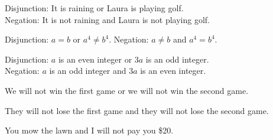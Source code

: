 \begin{list}{}
\item \begin{list}{\bf{(b)}}
\item Disjunction:  It is raining or Laura is playing golf.  \\Negation:  It is not raining and Laura is not playing golf.
\end{list}
\end{list}

\begin{list}{}
\item \begin{list}{\bf{(c)}}
\item Disjunction:  $a = b$ or $a^4 \ne b^4$.  Negation:  $a \ne b$ and $a^4 = b^4$.
\end{list}
\end{list}

\begin{list}{}
\item \begin{list}{\bf{(d)}}
\item Disjunction:  $a$ is an even integer or $3a$ is an odd integer.  \\Negation:  $a$ is an odd integer and $3a$ is an even integer.
\end{list}
\end{list}



\begin{list}{\bf{\ref{exer:sec23-3}.}}
\item \begin{list}{\bf{(a)}}
\item We will not win the first game or we will not win the second game.
\end{list}
\end{list}

\begin{list}{}
\item \begin{list}{\bf{(b)}}
\item They will not lose the first game and they will not lose the second game.
\end{list}
\end{list}

\begin{list}{}
\item \begin{list}{\bf{(c)}}
\item You mow the lawn and I will not pay you \$20.
\end{list}
\end{list}

